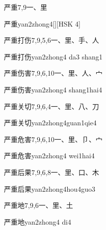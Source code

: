 \begin{Entry}{严重}{7,9}{⼀、⾥}
  \begin{Phonetics}{严重}{yan2zhong4}[][HSK 4]
  \end{Phonetics}
\end{Entry}

\begin{Entry}{严重打伤}{7,9,5,6}{⼀、⾥、⼿、⼈}
  \begin{Phonetics}{严重打伤}{yan2zhong4 da3 shang1}
  \end{Phonetics}
\end{Entry}

\begin{Entry}{严重伤害}{7,9,6,10}{⼀、⾥、⼈、⼧}
  \begin{Phonetics}{严重伤害}{yan2zhong4 shang1hai4}
  \end{Phonetics}
\end{Entry}

\begin{Entry}{严重关切}{7,9,6,4}{⼀、⾥、⼋、⼑}
  \begin{Phonetics}{严重关切}{yan2zhong4guan1qie4}
  \end{Phonetics}
\end{Entry}

\begin{Entry}{严重危害}{7,9,6,10}{⼀、⾥、⼙、⼧}
  \begin{Phonetics}{严重危害}{yan2zhong4 wei1hai4}
  \end{Phonetics}
\end{Entry}

\begin{Entry}{严重后果}{7,9,6,8}{⼀、⾥、⼝、⽊}
  \begin{Phonetics}{严重后果}{yan2zhong4hou4guo3}
  \end{Phonetics}
\end{Entry}

\begin{Entry}{严重地}{7,9,6}{⼀、⾥、⼟}
  \begin{Phonetics}{严重地}{yan2zhong4 di4}
  \end{Phonetics}
\end{Entry}

